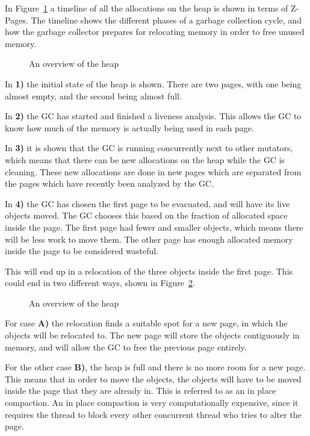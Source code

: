 In Figure~\ref{fig:zgc_timeline} a timeline of all the allocations on the heap is shown in terms of Z-Pages. The timeline shows the different phases of a garbage collection cycle, and how the garbage collector prepares for relocating memory in order to free unused memory.

\begin{figure}[!h]
    \centering
    
    \caption{An overview of the heap}
    \label{fig:zgc_timeline}
\end{figure}

In \textbf{1)} the initial state of the heap is shown. There are two pages, with one being almost empty, and the second being almost full.

In \textbf{2)} the GC has started and finished a liveness analysis. This allows the GC to know how much of the memory is actually being used in each page. 

In \textbf{3)} it is shown that the GC is running concurrently next to other mutators, which means that there can be new allocations on the heap while the GC is cleaning. These new allocations are done in new pages which are separated from the pages which have recently been analyzed by the GC. 

In \textbf{4)} the GC has chosen the first page to be evacuated, and will have its live objects moved. The GC chooses this based on the fraction of allocated space inside the page. The first page had fewer and smaller objects, which means there will be less work to move them. The other page has enough allocated memory inside the page to be considered wasteful.

This will end up in a relocation of the three objects inside the first page. This could end in two different ways, shown in Figure~\ref{fig:zreloc}.

\begin{figure}[!h]
    \centering
    
    \caption{An overview of the heap}
    \label{fig:zreloc}
\end{figure}
For case \textbf{A)} the relocation finds a suitable spot for a new page, in which the objects will be relocated to. The new page will store the objects contiguously in memory, and will allow the GC to free the previous page entirely.

For the other case \textbf{B)}, the heap is full and there is no more room for a new page. This means that in order to move the objects, the objects will have to be moved inside the page that they are already in. This is referred to as an in place compaction. An in place compaction is very computationally expensive, since it requires the thread to block every other concurrent thread who tries to alter the page. 
